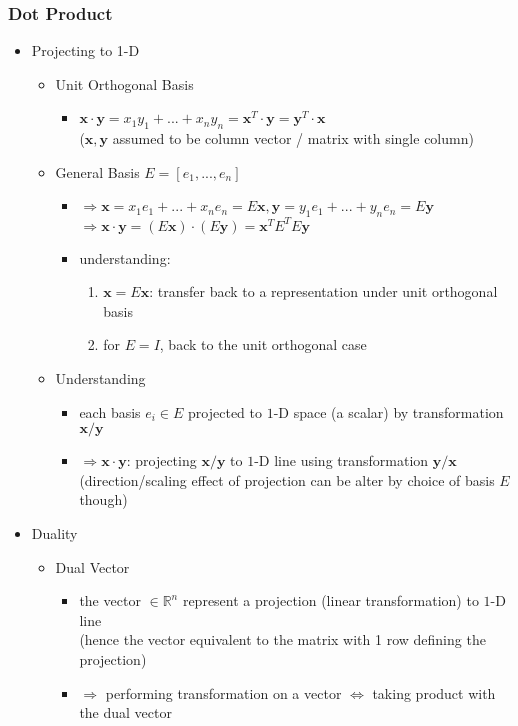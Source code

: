 \subsubsection{Dot Product}
\begin{itemize}
\item Projecting to 1-D
	\begin{itemize}
	\item Unit Orthogonal Basis
		\begin{itemize}
		\item $\mathbf x\cdot \mathbf y = x_1y_1 +...+ x_ny_n = \mathbf x^T \cdot \mathbf y = \mathbf y^T\cdot \mathbf x$ \\
		($\mathbf x,\mathbf y$ assumed to be column vector / matrix with single column)
		\end{itemize}
	\item General Basis $E=[e_1,...,e_n]$
		\begin{itemize}
		\item $\Rightarrow \mathbf x = x_1e_1+...+x_ne_n=E\mathbf x, \mathbf y = y_1e_1+...+y_ne_n = E \mathbf y$ \\
		$\Rightarrow \mathbf x\cdot \mathbf y = (E\mathbf x) \cdot (E \mathbf y) = \mathbf x^TE^TE\mathbf y$
		\item understanding: 
			\begin{enumerate}
			\item $\mathbf x = E\mathbf x$: transfer back to a representation under unit orthogonal basis
			\item for $E=I$, back to the unit orthogonal case
			\end{enumerate}
		\end{itemize}
	\item Understanding
		\begin{itemize}
		\item each basis $e_i\in E$ projected to $1$-D space (a scalar) by transformation $\mathbf x/\mathbf y$
		\item $\Rightarrow \mathbf x\cdot \mathbf y$: projecting $\mathbf x/\mathbf y$ to $1$-D line using transformation $\mathbf y/\mathbf x$ \\ 
		(direction/scaling effect of projection can be alter by choice of basis $E$ though)
		\end{itemize}
	\end{itemize}
\item Duality
	\begin{itemize}
	\item Dual Vector
		\begin{itemize}
		\item the vector $\in\mathbb R^n$ represent a projection (linear transformation) to $1$-D line \\
		(hence the vector equivalent to the matrix with 1 row defining the projection)
		\item $\Rightarrow$ performing transformation on a vector $\Leftrightarrow$ taking product with the dual vector
		\end{itemize}
	\end{itemize}
\end{itemize}

